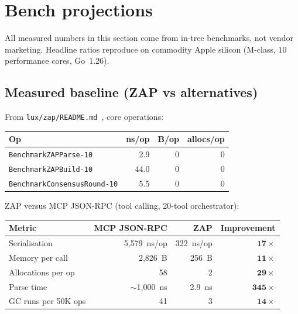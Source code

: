 \section{Bench projections}
\label{sec:bench}

All measured numbers in this section come from in-tree benchmarks,
not vendor marketing. Headline ratios reproduce on commodity Apple
silicon (M-class, $10$ performance cores, Go~1.26).

\subsection{Measured baseline (ZAP vs alternatives)}

From \texttt{lux/zap/README.md}~\cite{zapreadme}, core operations:

\begin{center}
\begin{tabular}{lrrr}
\toprule
\textbf{Op} & \textbf{ns/op} & \textbf{B/op} & \textbf{allocs/op} \\
\midrule
\texttt{BenchmarkZAPParse-10}        & 2.9  & 0 & 0 \\
\texttt{BenchmarkZAPBuild-10}        & 44.0 & 0 & 0 \\
\texttt{BenchmarkConsensusRound-10}  & 5.5  & 0 & 0 \\
\bottomrule
\end{tabular}
\end{center}

ZAP versus MCP JSON-RPC (tool calling, 20-tool orchestrator):

\begin{center}
\begin{tabular}{lrrr}
\toprule
\textbf{Metric} & \textbf{MCP JSON-RPC} & \textbf{ZAP} & \textbf{Improvement} \\
\midrule
Serialisation       & 5{,}579~ns/op  & 322~ns/op   & $\bm{17\times}$  \\
Memory per call     & 2{,}826~B      & 256~B       & $\bm{11\times}$  \\
Allocations per op  & 58             & 2           & $\bm{29\times}$  \\
Parse time          & $\sim$1{,}000~ns & 2.9~ns    & $\bm{345\times}$ \\
GC runs per 50K ops & 41             & 3           & $\bm{14\times}$  \\
\bottomrule
\end{tabular}
\end{center}

